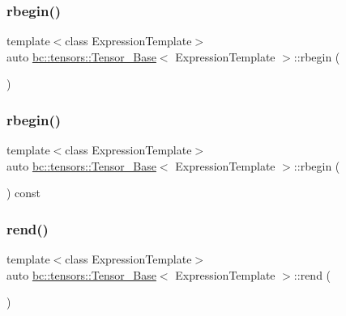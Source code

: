 \subsubsection{\texorpdfstring{rbegin()}{rbegin()}\hspace{0.1cm}{\footnotesize\ttfamily [1/2]}}
{\footnotesize\ttfamily template$<$class Expression\+Template$>$ \\
auto \hyperlink{classbc_1_1tensors_1_1Tensor__Base}{bc\+::tensors\+::\+Tensor\+\_\+\+Base}$<$ Expression\+Template $>$\+::rbegin (\begin{DoxyParamCaption}{ }\end{DoxyParamCaption})\hspace{0.3cm}{\ttfamily [inline]}}

\mbox{\label{classbc_1_1tensors_1_1Tensor__Base_ac00d10e279006dbdd13345d73824424c}} 
\subsubsection{\texorpdfstring{rbegin()}{rbegin()}\hspace{0.1cm}{\footnotesize\ttfamily [2/2]}}
{\footnotesize\ttfamily template$<$class Expression\+Template$>$ \\
auto \hyperlink{classbc_1_1tensors_1_1Tensor__Base}{bc\+::tensors\+::\+Tensor\+\_\+\+Base}$<$ Expression\+Template $>$\+::rbegin (\begin{DoxyParamCaption}{ }\end{DoxyParamCaption}) const\hspace{0.3cm}{\ttfamily [inline]}}

\mbox{\label{classbc_1_1tensors_1_1Tensor__Base_a667843a7f555dc076ae8db43a77d38b7}} 
\subsubsection{\texorpdfstring{rend()}{rend()}\hspace{0.1cm}{\footnotesize\ttfamily [1/2]}}
{\footnotesize\ttfamily template$<$class Expression\+Template$>$ \\
auto \hyperlink{classbc_1_1tensors_1_1Tensor__Base}{bc\+::tensors\+::\+Tensor\+\_\+\+Base}$<$ Expression\+Template $>$\+::rend (\begin{DoxyParamCaption}{ }\end{DoxyParamCaption})\hspace{0.3cm}{\ttfamily [inline]}}

